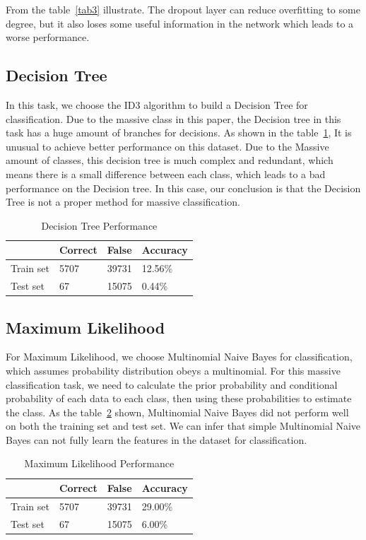 \documentclass[runningheads]{llncs}
\begin{document}
From the table~\ref{tab3} illustrate. The dropout layer can reduce overfitting to some degree, but it also loses some useful information in the network which leads to a worse performance.
\subsection{Decision Tree}
In this task, we choose the ID3 algorithm to build a Decision Tree for classification. Due to the massive class in this paper, the Decision tree in this task has a huge amount of branches for decisions. As shown in the table~\ref{tab4}, It is unusual to achieve better performance on this dataset. Due to the Massive amount of classes, this decision tree is much complex and redundant, which means there is a small difference between each class, which leads to a bad performance on the Decision tree. In this case, our conclusion is that the Decision Tree is not a proper method for massive classification.

\begin{table}
	\caption{Decision Tree Performance }\label{tab4}
	\begin{center}
		\begin{tabular}{|l|l|l|l|}
			\hline
			          & Correct & False & Accuracy\\
			\hline
			Train set &  5707  &   39731   & 12.56\% \\
			Test set  &  67    &   15075   & 0.44\%\\
			\hline
		\end{tabular}
	\end{center}
\end{table}

\subsection{Maximum Likelihood}
For Maximum Likelihood, we choose Multinomial Naive Bayes for classification, which assumes probability distribution obeys a multinomial. For this massive classification task, we need to calculate the prior probability and conditional probability of each data to each class, then using these probabilities to estimate the class. As the table~\ref{tab5} shown, Multinomial Naive Bayes did not perform well on both the training set and test set. We can infer that simple Multinomial Naive Bayes can not fully learn the features in the dataset for classification.

\begin{table}
	\caption{Maximum Likelihood Performance }\label{tab5}
	\begin{center}
		\begin{tabular}{|l|l|l|l|}
			\hline
			& Correct & False & Accuracy\\
			\hline
			Train set &  5707  &   39731   & 29.00\% \\
			Test set  &  67    &   15075   & 6.00\%\\
			\hline
		\end{tabular}
	\end{center}
\end{table}
\end{document}
